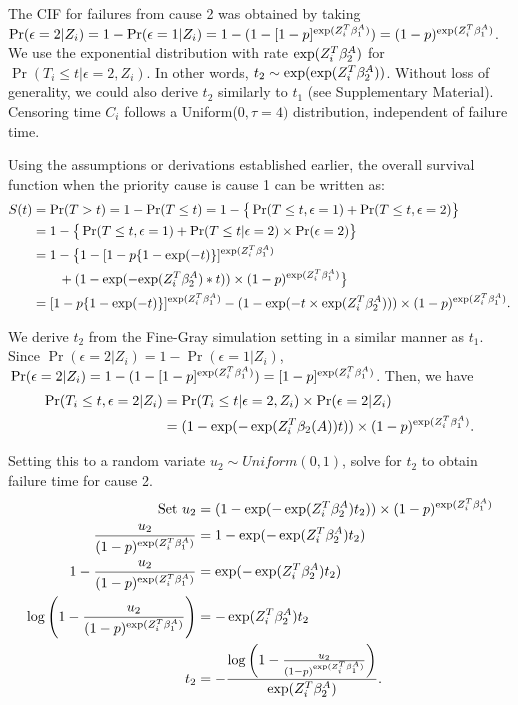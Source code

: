 The CIF for failures from cause 2 was obtained by taking $\Pr(\epsilon=2|Z_i)=1-\Pr(\epsilon=1|Z_i)=1-(1-[1-p]^{\exp(Z_i^T\beta_1^A)})=(1-p)^{\exp(Z_i^T\beta_1^A)}$. We use the exponential distribution with rate $\exp(Z_i^T\beta_2^A)$ for $\Pr(T_i \le t| \epsilon = 2, Z_i)$.
In other words, $t_2 \sim \exp(\exp(Z_i^T\beta_2^A))$. Without loss of generality, we could also derive $t_2$ similarly to $t_1$ (see Supplementary Material). Censoring time $C_i$ follows a Uniform($0,\tau = 4)$ distribution, independent of failure time. %

Using the assumptions or derivations established earlier, the overall survival function when the priority cause is cause 1 can be written as:
\begin{equation*} 
\begin{split}
\label{eq_simval1}
S(t) 
&= \Pr(T > t) = 1 - \Pr(T \leq t) 
= 1 - \big\{\Pr(T \leq t, \epsilon = 1) + \Pr(T \leq t, \epsilon = 2)\big\} \\ 
&= 1- \big\{\Pr(T \leq t, \epsilon = 1) + \Pr(T\leq t| \epsilon = 2) \times \Pr(\epsilon = 2) \big\} \\
&= 1 - \big\{1-[1-p\{1-\exp(-t)\}]^{\exp(Z_i^T\beta_1^A)} \\ 
&\quad \quad + (1 - \exp(-{\exp(Z_i^T\beta_2^A)}*t)) \times (1-p)^{\exp(Z_i^T\beta_1^A)} \big\} \\
&= [1-p\{1-\exp(-t)\}]^{\exp(Z_i^T\beta_1^A)} - (1 - \exp(-t \times {\exp(Z_i^T\beta_2^A)})) \times (1-p)^{\exp(Z_i^T\beta_1^A)}.\\
\end{split}
\end{equation*}

We derive $t_{2}$ from the Fine-Gray simulation setting in a similar manner as $t_1$. Since $\Pr(\epsilon=2|Z_i)=1-\Pr(\epsilon=1|Z_i)$, $\, \Pr(\epsilon=2|Z_i)=1-(1-[1-p]^{\exp(Z_i^T\beta_1^A)}) = [1-p]^{\exp(Z_i^T\beta_1^A)}$. Then, we have
\begin{align*}
\label{eq_sim2}
\Pr(T_i \le t, \epsilon = 2|Z_i)  &=
\Pr(T_i \le t|\epsilon = 2, Z_i)\times \Pr(\epsilon = 2|Z_i)\\
 &= (1-\exp(-\exp(Z^T_i\beta_2(A))t)) \times (1-p)^{\exp(Z_i^T\beta_1^A)}.
\end{align*}

Setting this to a random variate $u_2 \sim Uniform(0,1)$, solve for $t_2$ to obtain failure time for cause 2.
\begin{align*}
\text{Set } u_2 &= (1 - \exp(-\exp(Z_i^T\beta_2^A) t_2)) \times (1 - p)^{\exp(Z_i^T\beta_1^A)} \\
\frac{u_2}{(1 - p)^{\exp(Z_i^T\beta_1^A)}} &= 1 - \exp(-\exp(Z_i^T\beta_2^A) t_2) \\
1 - \frac{u_2}{(1 - p)^{\exp(Z_i^T\beta_1^A)}} &= \exp(-\exp(Z_i^T\beta_2^A) t_2) \\
\log\left(1 - \frac{u_2}{(1 - p)^{\exp(Z_i^T\beta_1^A)}}\right) &= -\exp(Z_i^T\beta_2^A) t_2 \\
t_2 &= -\frac{\log\left(1 - \frac{u_2}{(1 - p)^{\exp(Z_i^T\beta_1^A)}}\right)}{\exp(Z_i^T\beta_2^A)}.
\end{align*}